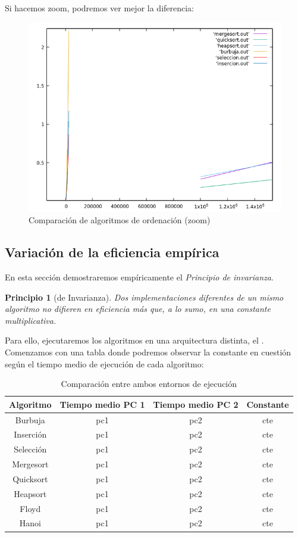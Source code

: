 \documentclass[12pt,spanish]{article}
\newtheorem{ppio}{Principio }
\begin{document}
Si hacemos zoom, podremos ver mejor la diferencia:

\begin{figure}[H]
\centering
\includegraphics[scale=0.75]{empirica_ordenacion_comparacion_zoom.png}
\caption{Comparación de algoritmos de ordenación (zoom)}
\end{figure}
\subsection{Variación de la eficiencia empírica}
\label{sec:variacion}
En esta sección demostraremos empíricamente el \emph{Principio de invarianza}.
\begin{ppio}[de Invarianza]
Dos implementaciones diferentes de un  mismo  algoritmo  no  difieren  en  eficiencia  más  que,  a  lo  sumo,  en  una constante multiplicativa.
\end{ppio}
Para ello, ejecutaremos los algoritmos en una arquitectura distinta, el \textit{}.
Comenzamos con una tabla donde podremos observar la constante en cuestión según el tiempo medio de ejecución de cada algoritmo:
\begin{table}[H]
\centering
\begin{tabular}{|c|c|c|c|}
\hline
\textbf{Algoritmo} & \textbf{Tiempo medio PC 1} & \textbf{Tiempo medio PC 2} & \textbf{Constante} \\
\hline
Burbuja & pc1 & pc2 & cte\\
\hline
Inserción & pc1 & pc2 & cte\\
\hline
Selección & pc1 & pc2 & cte\\
\hline
Mergesort & pc1 & pc2 & cte\\
\hline
Quicksort & pc1 & pc2 & cte\\
\hline
Heapsort & pc1 & pc2 & cte\\
\hline
Floyd & pc1 & pc2 & cte\\
\hline
Hanoi & pc1 & pc2 & cte\\
\hline
\end{tabular}
\caption{Comparación entre ambos entornos de ejecución}
\end{table}
\end{document}
